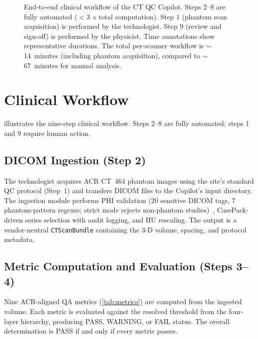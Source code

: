 \documentclass[11pt]{article}
\begin{document}
\begin{figure}[t]
\begin{tikzpicture}
\end{tikzpicture}
\caption{%
  End-to-end clinical workflow of the CT QC Copilot.
  Steps 2--8 are fully automated ($< 3$~s total computation).
  Step 1 (phantom scan acquisition) is performed by the technologist.
  Step 9 (review and sign-off) is performed by the physicist.
  Time annotations show representative durations.
  The total per-scanner workflow is $\sim$14~minutes (including
  phantom acquisition), compared to $\sim$67~minutes for manual analysis.
}
\label{fig:workflow}
\end{figure}


\section{Clinical Workflow}
\label{sec:workflow}

 illustrates the nine-step clinical workflow.
Steps 2--8 are fully automated; steps 1 and 9 require human action.

\subsection{DICOM Ingestion (Step 2)}

The technologist acquires ACR CT~464 phantom images using the site's
standard QC protocol (Step~1) and transfers DICOM files to the
Copilot's input directory.
The ingestion module performs PHI validation (20 sensitive DICOM
tags, 7 phantom-pattern regexes; strict mode rejects non-phantom
studies)~\cite{pydicom}, CasePack-driven series selection with
audit logging, and HU rescaling.
The output is a vendor-neutral \texttt{CTScanBundle} containing the
3-D volume, spacing, and protocol metadata.

\subsection{Metric Computation and Evaluation (Steps 3--4)}

Nine ACR-aligned QA metrics (\cref{tab:metrics}) are computed from
the ingested volume.
Each metric is evaluated against the resolved threshold from the
four-layer hierarchy, producing PASS, WARNING, or FAIL status.
The overall determination is PASS if and only if every metric passes.
\end{document}
